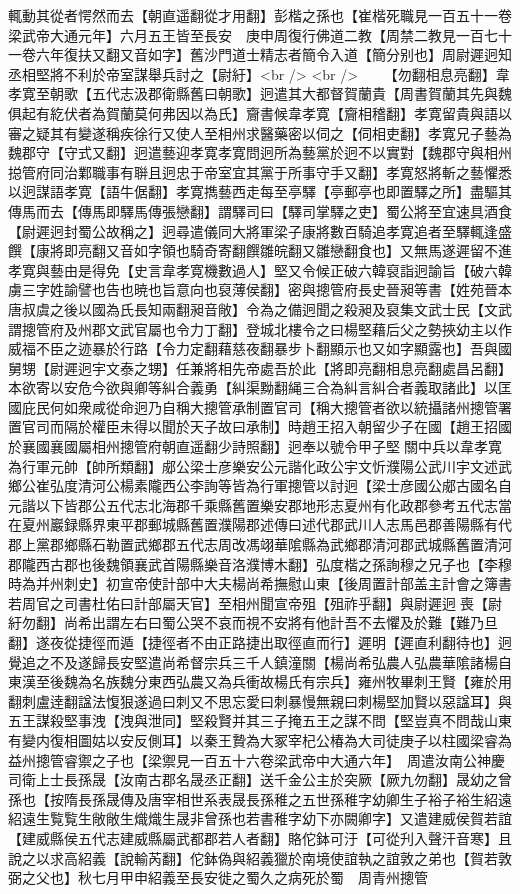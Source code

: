 輒動其從者愕然而去【朝直遥翻從才用翻】彭楷之孫也【崔楷死職見一百五十一卷梁武帝大通元年】六月五王皆至長安　庚申周復行佛道二教【周禁二教見一百七十一卷六年復扶又翻又音如字】舊沙門道士精志者簡令入道【簡分别也】周尉遲迥知丞相堅將不利於帝室謀舉兵討之【尉紆】<br />
<br />
　　【勿翻相息亮翻】韋孝寛至朝歌【五代志汲郡衛縣舊曰朝歌】迥遣其大都督賀蘭貴【周書賀蘭其先與魏俱起有紇伏者為賀蘭莫何弗因以為氏】齎書候韋孝寛【齎相稽翻】孝寛留貴與語以審之疑其有變遂稱疾徐行又使人至相州求醫藥密以伺之【伺相吏翻】孝寛兄子藝為魏郡守【守式又翻】迥遣藝迎孝寛孝寛問迥所為藝黨於迥不以實對【魏郡守與相州搃管府同治鄴職事有聨且迥忠于帝室宜其黨于所事守手又翻】孝寛怒將斬之藝懼悉以迥謀語孝寛【語牛倨翻】孝寛擕藝西走每至亭驛【亭郵亭也即置驛之所】盡驅其傳馬而去【傳馬即驛馬傳張戀翻】謂驛司曰【驛司掌驛之吏】蜀公將至宜速具酒食【尉遲迥封蜀公故稱之】迥尋遣儀同大將軍梁子康將數百騎追孝寛追者至驛輒逢盛饌【康將即亮翻又音如字領也騎奇寄翻饌雛皖翻又雛戀翻食也】又無馬遂遲留不進孝寛與藝由是得免【史言韋孝寛機數過人】堅又令候正破六韓裒詣迥諭旨【破六韓虜三字姓諭譬也告也暁也旨意向也裒薄侯翻】密與摠管府長史晉昶等書【姓苑晉本唐叔虞之後以國為氏長知兩翻昶音敞】令為之備迥聞之殺昶及裒集文武士民【文武謂摠管府及州郡文武官屬也令力丁翻】登城北樓令之曰楊堅藉后父之勢挾幼主以作威福不臣之迹暴於行路【令力定翻藉慈夜翻暴步卜翻顯示也又如字顯露也】吾與國舅甥【尉遲迥宇文泰之甥】任兼將相先帝處吾於此【將即亮翻相息亮翻處昌呂翻】本欲寄以安危今欲與卿等糾合義勇【糾渠黝翻䋲三合為糾言糾合者義取諸此】以匡國庇民何如衆咸從命迥乃自稱大摠管承制置官司【稱大摠管者欲以統攝諸州摠管署置官司而隔於權臣未得以聞於天子故曰承制】時趙王招入朝留少子在國【趙王招國於襄國襄國屬相州摠管府朝直遥翻少詩照翻】迥奉以號令甲子堅關中兵以韋孝寛為行軍元帥【帥所類翻】郕公梁士彦樂安公元諧化政公宇文忻濮陽公武川宇文述武鄉公崔弘度清河公楊素隴西公李詢等皆為行軍摠管以討迥【梁士彦國公郕古國名自元諧以下皆郡公五代志北海郡千乘縣舊置樂安郡地形志夏州有化政郡參考五代志當在夏州巖録縣界東平郡郵城縣舊置濮陽郡述傳曰述代郡武川人志馬邑郡善陽縣有代郡上黨郡鄉縣石勒置武鄉郡五代志周改馮翊華隂縣為武鄉郡清河郡武城縣舊置清河郡隴西古郡也後魏領襄武首陽縣樂音洛濮博木翻】弘度楷之孫詢穆之兄子也【李穆時為并州刺史】初宣帝使計部中大夫楊尚希撫慰山東【後周置計部盖主計會之簿書若周官之司書杜佑曰計部屬天官】至相州聞宣帝殂【殂祚乎翻】與尉遲迥喪【尉紆勿翻】尚希出謂左右曰蜀公哭不哀而視不安將有他計吾不去懼及於難【難乃旦翻】遂夜從捷徑而遁【捷徑者不由正路捷出取徑直而行】遲明【遲直利翻待也】迥覺追之不及遂歸長安堅遣尚希督宗兵三千人鎮潼關【楊尚希弘農人弘農華隂諸楊自東漢至後魏為名族魏分東西弘農又為兵衝故楊氏有宗兵】雍州牧畢刺王賢【雍於用翻刺盧逹翻諡法愎狠遂過曰刺又不思忘愛曰刺暴慢無親曰刺楊堅加賢以惡諡耳】與五王謀殺堅事洩【洩與泄同】堅殺賢并其三子掩五王之謀不問【堅豈真不問哉山東有變内復相圖姑以安反側耳】以秦王贄為大冢宰杞公椿為大司徒庚子以柱國梁睿為益州摠管睿禦之子也【梁禦見一百五十六卷梁武帝中大通六年】　周遣汝南公神慶司衛上士長孫晟【汝南古郡名晟丞正翻】送千金公主於突厥【厥九勿翻】晟幼之曾孫也【按隋長孫晟傳及唐宰相世系表晟長孫稚之五世孫稚字幼卿生子裕子裕生紹遠紹遠生覧覧生敞敞生熾熾生晟非曾孫也若書稚字幼下亦闕卿字】又遣建威侯賀若誼【建威縣侯五代志建威縣屬武都郡若人者翻】賂佗鉢可汙【可從刋入聲汗音寒】且說之以求高紹義【說輸芮翻】佗鉢偽與紹義獵於南境使誼執之誼敦之弟也【賀若敦弼之父也】秋七月甲申紹義至長安徙之蜀久之病死於蜀　周青州摠管